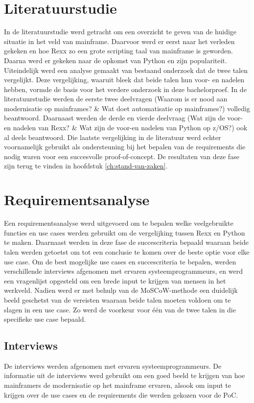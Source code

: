 \section{Literatuurstudie}
In de literatuurstudie werd getracht om een overzicht te geven van de huidige situatie in het veld van mainframe. Daarvoor werd er eerst naar het verleden gekeken en hoe Rexx zo een grote scripting taal van mainframe is geworden. Daarna werd er gekeken naar de opkomst van Python en zijn populariteit. Uiteindelijk werd een analyse gemaakt van bestaand onderzoek dat de twee talen vergelijkt. Deze vergelijking, waaruit bleek dat beide talen hun voor- en nadelen hebben, vormde de basis voor het verdere onderzoek in deze bachelorproef. In de literatuurstudie werden de eerste twee deelvragen (Waarom is er nood aan modernisatie op mainframes? \& Wat doet automatisatie op mainframes?) volledig beantwoord. Daarnaast werden de derde en vierde deelvraag (Wat zijn de voor- en nadelen van Rexx? \& Wat zijn de voor-en nadelen van Python op z/OS?) ook al deels beantwoord. Die laatste vergelijking in de literatuur werd echter voornamelijk gebruikt als ondersteuning bij het bepalen van de requirements die nodig waren voor een succesvolle proof-of-concept. De resultaten van deze fase zijn terug te vinden in hoofdstuk \ref{ch:stand-van-zaken}.

\section{Requirementsanalyse}
Een requirementsanalyse werd uitgevoerd om te bepalen welke veelgebruikte functies en use cases werden gebruikt om de vergelijking tussen Rexx en Python te maken. Daarnaast werden in deze fase de succescriteria bepaald waaraan beide talen werden getoetst om tot een conclusie te komen over de beste optie voor elke use case. Om de best mogelijke use cases en succescriteria te bepalen, werden verschillende interviews afgenomen met ervaren systeemprogrammeurs, en werd een vragenlijst opgesteld om een brede input te krijgen van mensen in het werkveld. Nadien werd er met behulp van de MoSCoW-methode een duidelijk beeld geschetst van de vereisten waaraan beide talen moeten voldoen om te slagen in een use case. Zo werd de voorkeur voor één van de twee talen in die specifieke use case bepaald. 

\subsection{Interviews}
De interviews werden afgenomen met ervaren systeemprogrammeurs. De informatie uit de interviews werd gebruikt om een goed beeld te krijgen van hoe mainframers de modernisatie op het mainframe ervaren, alsook om input te krijgen over de use cases en de requirements die werden gekozen voor de PoC.

